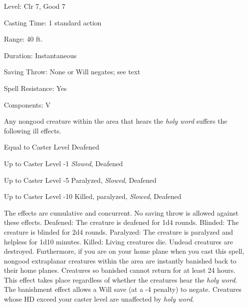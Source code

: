 
\begin{description*}
\item[Level:] Clr 7, Good 7
\item[Casting Time:] 1 standard action
\item[Range:] 40 ft.
\item[Duration:] Instantaneous
\item[Saving Throw:] None or Will negates; see text
\item[Spell Resistance:] Yes
\item[Components:] V
\end{description*}

Any nongood creature within the area that hears the \textit{holy word} suffers
the following ill effects.
\begin{description*}
\item[Equal to Caster Level] Deafened
\item[Up to Caster Level -1] \textit{Slowed}, Deafened
\item[Up to Caster Level -5] Paralyzed, \textit{Slowed}, Deafened
\item[Up to Caster Level -10] Killed, paralyzed, \textit{Slowed}, Deafened
\end{description*}
The effects are cumulative and concurrent. No saving throw is allowed against these
effects.
Deafened: The creature is deafened for 1d4 rounds.
Blinded: The creature is blinded for 2d4 rounds.
Paralyzed: The creature is paralyzed and helpless for 1d10 minutes.
Killed: Living creatures die. Undead creatures are destroyed.
Furthermore, if you are on your home plane when you cast this spell, nongood extraplanar
creatures within the area are instantly banished back to their home planes. Creatures
so banished cannot return for at least 24 hours. This effect takes place regardless
of whether the creatures hear the \textit{holy word}. The banishment effect allows
a Will save (at a -4 penalty) to negate.
Creatures whose HD exceed your caster level are unaffected by \textit{holy word}.